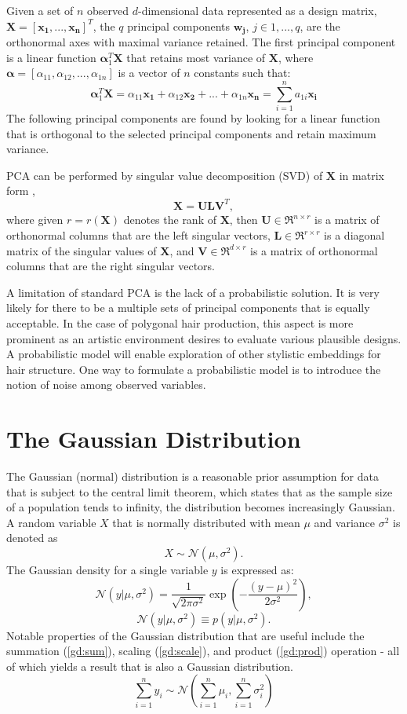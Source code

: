 \documentclass[ %
author={Dillon Keith Diep},
supervisor={Dr. Carl Henrik Ek},
degree={MEng},
title={ART-CG:},
subtitle={Assisted Real-time Content Generation of 3D Hair by Learning Manifolds},
type={Research},
year={2017} ]{dissertation}
\begin{document}
Given a set of $n$ observed $d$-dimensional data represented as a design matrix, $\bm{X=[x_1,...,x_n]}^T$, the $q$ principal components $\bm{w_j}$, $j \in {1,...,q}$, are the orthonormal axes with maximal variance retained. The first principal component is a linear function $\bm{\alpha}^T_1\bm{X}$ that retains most variance of $\bm{X}$, where $\bm{\alpha} = [\alpha_{11}, \alpha_{12}, ..., \alpha_{1n}]$ is a vector of $n$ constants such that:
$$\bm{\alpha}^T_1\bm{X}=\alpha_{11}\bm{x_1}+\alpha_{12}\bm{x_2}+...+\alpha_{1n}\bm{x_n} = \sum^n_{i=1}a_{1i}\bm{x_i}$$
The following principal components are found by looking for a linear function that is orthogonal to the selected principal components and retain maximum variance.

PCA can be performed by singular value decomposition (SVD) of $\bm{X}$ in matrix form \cite{pca2002},
$$\bm{X=ULV}^T,$$
where given $r = r(\bm{X})$ denotes the rank of $\bm{X}$, then
$\bm{U} \in \Re^{n \times r}$ is a matrix of orthonormal columns that are the left singular vectors,
$\bm{L} \in \Re^{r \times r}$ is a diagonal matrix of the singular values of $\bm{X}$, and
$\bm{V} \in \Re^{d \times r}$ is a matrix of orthonormal columns that are the right singular vectors.

A limitation of standard PCA is the lack of a probabilistic solution. 
It is very likely for there to be a multiple sets of principal components that is equally acceptable. In the case of polygonal hair production, this aspect is more prominent as an artistic environment desires to evaluate various plausible designs. A probabilistic model will enable exploration of other stylistic embeddings for hair structure. One way to formulate a probabilistic model is to introduce the notion of noise among observed variables.

\section{The Gaussian Distribution}
The Gaussian (normal) distribution is a reasonable prior assumption for data that is subject to the central limit theorem, which states that as the sample size of a population tends to infinity, the distribution becomes increasingly Gaussian\cite[p.78]{bishop}.
A random variable $X$ that is normally distributed with mean $\mu$ and variance $\sigma^2$ is denoted as
$$X\sim\mathcal{N}(\mu, \sigma^2).$$
The Gaussian density for a single variable $y$ is expressed as\cite[p.78]{bishop}:
$$\mathcal{N}(y|\mu, \sigma^2)=\frac{1}{\sqrt{2\pi\sigma^2}}\exp\left(-\frac{(y-\mu)^2}{2\sigma^2}\right),$$
$$\mathcal{N}(y|\mu,\sigma^2) \equiv p(y|\mu,\sigma^2).$$
Notable properties of the Gaussian distribution that are useful include the summation (\ref{gd:sum}), scaling (\ref{gd:scale}), and product (\ref{gd:prod}) operation - all of which yields a result that is also a Gaussian distribution\cite[p.200]{gp}.
\begin{equation} \label{gd:sum}
\sum^n_{i=1}y_i\sim\mathcal{N}(\sum^n_{i=1}\mu_i,\sum^n_{i=1}\sigma^2_i)
\end{equation}
\end{document}
